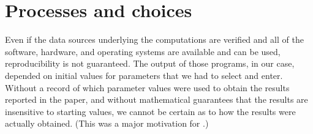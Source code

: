 \section{Processes and choices} %
\label{sec:processes_and_choices}

Even if the data sources underlying the computations are verified and all of the software, hardware, and operating systems are available and can be used, reproducibility is not guaranteed.  The output of those programs, in our case, depended on initial values for parameters that we had to select and enter.  Without a record of which parameter values were used to obtain the results reported in the paper, and without mathematical guarantees that the results are insensitive to starting values, we cannot be certain as to how the results were actually obtained.  (This was a major motivation for \citet{Buckheit:1995hl}.)

